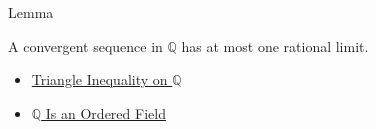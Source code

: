 \begin{lemmabox}{Lemma}
\begin{lemma}
\label{lem:rational-limit-unique}
A convergent sequence in $\mathbb{Q}$ has at most one rational limit.
\end{lemma}
\end{lemmabox}

\begin{dependencies}
\begin{itemize}
  \item \hyperref[thm:triangle-inequality-on-q]{Triangle Inequality on $\mathbb{Q}$}
  \item \hyperref[thm:q-is-an-ordered-field]{$\mathbb{Q}$ Is an Ordered Field}
\end{itemize}
\end{dependencies}
